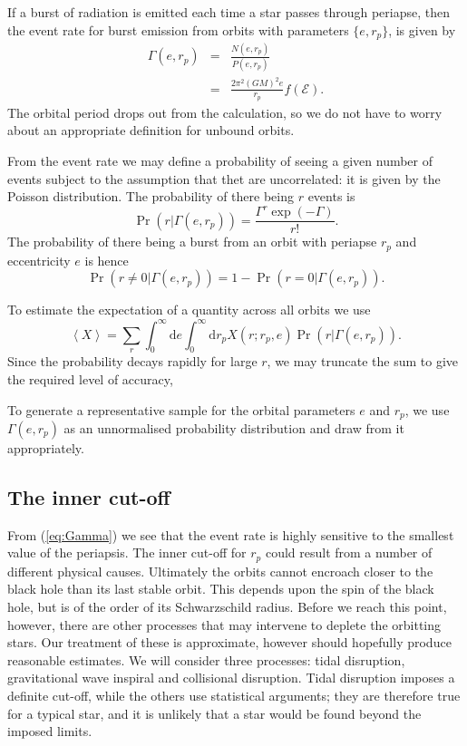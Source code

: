\documentclass[useAMS,usedcolumn,usegraphicx,usenatbib]{mn2e}
\newcommand{\eqnref}[1]{(\ref{eq:#1})}
\newcommand{\dd}{\ensuremath{\mathrm{d}}}
\begin{document}
If a burst of radiation is emitted each time a star passes through periapse, then the event rate for burst emission from orbits with parameters $\{e, r_p\}$, is given by
\begin{eqnarray}
\Gamma(e, r_p) &=& \frac{N(e, r_p)}{P(e, r_p)}\\
 &=& \frac{2\pi^2(GM)^2 e}{r_p}f(\mathcal{E}).
\label{eq:Gamma}
\end{eqnarray}
The orbital period drops out from the calculation, so we do not have to worry about an appropriate definition for unbound orbits.

From the event rate we may define a probability of seeing a given number of events subject to the assumption that thet are uncorrelated: it is given by the Poisson distribution. The probability of there being $r$ events is
\begin{equation}
\Pr(r|\Gamma(e, r_p)) = \frac{\Gamma^r\exp(-\Gamma)}{r!}.
\end{equation}
The probability of there being a burst from an orbit with periapse $r_p$ and eccentricity $e$ is hence
\begin{equation}
\Pr(r \neq 0|\Gamma(e, r_p)) = 1 - \Pr(r = 0|\Gamma(e, r_p)).
\end{equation}

To estimate the expectation of a quantity across all orbits we use
\begin{equation}
\left\langle X\right\rangle = \sum_r \int_0^\infty \dd e \int_0^\infty \dd r_p X(r;r_p,e)\Pr(r|\Gamma(e, r_p)).
\end{equation}
Since the probability decays rapidly for large $r$, we may truncate the sum to give the required level of accuracy,

To generate a representative sample for the orbital parameters $e$ and $r_p$, we use $\Gamma(e, r_p)$ as an unnormalised probability distribution and draw from it appropriately.

\subsection{The inner cut-off}

From \eqnref{Gamma} we see that the event rate is highly sensitive to the smallest value of the periapsis. The inner cut-off for $r_p$ could result from a number of different physical causes. Ultimately the orbits cannot encroach closer to the black hole than its last stable orbit. This depends upon the spin of the black hole, but is of the order of its Schwarzschild radius. Before we reach this point, however, there are other processes that may intervene to deplete the orbitting stars. Our treatment of these is approximate, however should hopefully produce reasonable estimates. We will consider three processes: tidal disruption, gravitational wave inspiral and collisional disruption. Tidal disruption imposes a definite cut-off, while the others use statistical arguments; they are therefore true for a typical star, and it is unlikely that a star would be found beyond the imposed limits.
\end{document}
